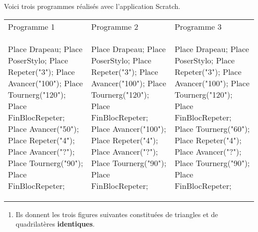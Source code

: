 \begin{exercice}
   Voici trois programmes réalisés avec l'application Scratch.

   \newcommand{\echelleAunMlozCinq}{0.8}
   \small{
      \begin{center}
         \begin{tabularx}{\linewidth}{|*{3}{>{\centering \arraybackslash}X|}}\hline
         Programme 1 &Programme 2 &Programme  3\rule[-3mm]{0mm}{6mm}\\
         \begin{Scratch}[Numerotation,Echelle=\echelleAunMlozCinq]
            Place Drapeau;
            Place PoserStylo;
            Place Repeter("3");
               Place Avancer("100");
               Place Tournerg("120");
            Place FinBlocRepeter;
            Place Avancer("50");
            Place Repeter("4");
               Place Avancer("?");
               Place Tournerg("90");
            Place FinBlocRepeter;
         \end{Scratch}
         &
         \begin{Scratch}[Numerotation,Echelle=\echelleAunMlozCinq]
            Place Drapeau;
            Place PoserStylo;
            Place Repeter("3");
               Place Avancer("100");
               Place Tournerg("120");
            Place FinBlocRepeter;
            Place Avancer("100");
            Place Repeter("4");
               Place Avancer("?");
               Place Tournerg("90");
            Place FinBlocRepeter;
         \end{Scratch}
         &
         \begin{Scratch}[Numerotation,Echelle=\echelleAunMlozCinq]
            Place Drapeau;
            Place PoserStylo;
            Place Repeter("3");
               Place Avancer("100");
               Place Tournerg("120");
            Place FinBlocRepeter;
            Place Tournerg("60");
            Place Repeter("4");
               Place Avancer("?");
               Place Tournerg("90");
            Place FinBlocRepeter;
         \end{Scratch}
         \\ \hline
         \end{tabularx}
       \end{center}
   }
   \begin{enumerate}
   \item Ils donnent les trois figures suivantes constituées de triangles et de quadrilatères \textbf{identiques}.


\end{enumerate}
\end{exercice}
